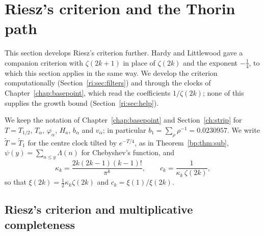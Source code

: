 \section{Riesz's criterion and the Thorin path}\label{ch:riesz}

This section develops Riesz's criterion further. Hardy and Littlewood \cite{HL16} gave a companion criterion with $\zeta(2k+1)$ in place of $\zeta(2k)$ and the exponent $-\frac14$, to which this section applies in the same way. We develop the criterion computationally (Section~\ref{ri:sec:filters}) and through the clocks of Chapter~\ref{chap:basepoint}, which read the coefficients $1/\zeta(2k)$; none of this supplies the growth bound (Section~\ref{ri:sec:help}).

We keep the notation of Chapter~\ref{chap:basepoint} and Section~\ref{ch:strip} for $T=T_{1/2}$, $T_\alpha$, $\varphi_\alpha$, $H_a$, $b_\alpha$ and $v_\alpha$; in particular $b_1=\sum_\rho\rho^{-1}=0.0230957$. We write $\widetilde T=\widetilde T_1$ for the centre clock tilted by $e^{-T/4}$, as in Theorem~\ref{bp:thm:sub}, $\psi(y)=\sum_{n\le y}\Lambda(n)$ for Chebyshev's function, and
\[
\kappa_k=\frac{2k(2k-1)(k-1)!}{\pi^k},\qquad c_k=\frac1{\kappa_k\,\zeta(2k)},
\]
so that $\xi(2k)=\frac12\kappa_k\zeta(2k)$ and $c_k=\xi(1)/\xi(2k)$.

\subsection{Riesz's criterion and multiplicative completeness}\label{wr:sec:riesz}

